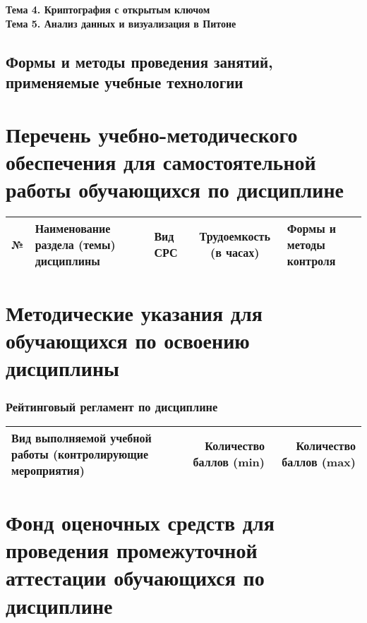 \documentclass[a4paper,12pt]{article}
\begin{document}
\textbf{Тема 4. Криптография с открытым ключом                  }\\


\textbf{Тема 5. Анализ данных и визуализация в Питоне      }\\

 

\subsection{Формы и методы проведения занятий, применяемые учебные технологии}




\section{Перечень учебно-методического обеспечения для самостоятельной работы обучающихся по дисциплине}
\begin{longtable}{|l|>{\raggedright\arraybackslash}p{40mm}|>{\raggedright\arraybackslash}p{54mm}|c|>{\raggedright\arraybackslash}p{30mm}|}
\hline
№ & \centering Наименование раздела (темы) дисциплины & 
\centering Вид СРС & \multicolumn{1}{p{14mm}|}{\centering Трудо\-емкость (в часах)} & \centering\arraybackslash Формы и методы контроля\\

\hline
\end{longtable}


\section{Методические указания для обучающихся по освоению дисциплины}



\subsubsection*{Рейтинговый регламент по дисциплине}
\begin{longtable}{|>{\raggedright\arraybackslash}p{110mm}|r|r|}
\hline
\centering\arraybackslash Вид выполняемой учебной работы (контролирующие мероприятия) & 
\multicolumn{1}{p{20mm}|}{\centering\arraybackslash Количество баллов (min)} & 
\multicolumn{1}{p{20mm}|}{\centering\arraybackslash Количество баллов (max)} \\

\hline
\end{longtable}

\newpage
\section{Фонд оценочных средств для проведения промежуточной аттестации обучающихся по дисциплине}
\end{document}
